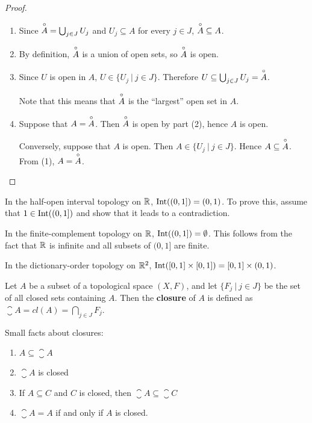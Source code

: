 \begin{proof}
	\begin{enumerate}
		\item Since $\overset{\circ}{A} = \bigcup_{j\in J} U_j$ and $U_j \subseteq A$ for every $j \in J$, $\overset{\circ}{A}\subseteq A$. 
		\item By definition, $\overset{\circ}{A}$ is a union of open sets, so $\overset{\circ}{A}$ is open. 
		\item Since $U$ is open in $A$, $U \in \{ U_j\ |\ j\in J\}$. Therefore $U\subseteq \bigcup_{j\in J} U_j = \overset{\circ}{A}$. 
		
		Note that this means that $\overset{\circ}{A}$ is the ``largest'' open set in $A$. 
		\item Suppose that $A = \overset{\circ}{A}$. Then $\overset{\circ}{A}$ is open by part (2), hence $A$ is open.
		
		Conversely, suppose that $A$ is open. Then $A\in \{U_j\ |\ j\in J\}$. Hence $A \subseteq \overset{\circ}{A}$. From (1), $A = \overset{\circ}{A}$. 
	\end{enumerate}
\end{proof}
\begin{example}
	In the half-open interval topology on $\mathbb R$, $\mathrm{Int}((0,1])=(0,1)$. To prove this, assume that $1\in \mathrm{Int}((0,1])$ and show that it leads to a contradiction. 
\end{example}
\begin{example}
	In the finite-complement topology on $\mathbb R$, $\mathrm{Int}((0,1])= \emptyset$. This follows from the fact that $\mathbb R$ is infinite and all subsets of $(0,1]$ are finite. 
\end{example}
\begin{example}
	In the dictionary-order topology on $\mathbb R^2$, $\mathrm{Int}( [ 0,1] \times [ 0,1] ) = [0,1] \times (0,1)$. \placeholder 
\end{example}
\begin{definition}
	Let $A$ be a subset of a topological space $(X,F)$, and let $\{ F_j\ |\ j \in J \}$ be the set of all closed sets containing $A$. Then the {\bf closure} of $A$ is defined as $\closure{A} = cl(A) = \bigcap_{j \in J}F_j$. 
\end{definition}
\begin{smallfact}
	Small facts about closures: 
	\begin{enumerate}
		\item $A \subseteq \closure{A}$ 
		\item $\closure{A}$ is closed 
		\item If $A \subseteq C$ and $C$ is closed, then $\closure{A}\subseteq\closure{C}$ 
		\item $\closure{A}=A$ if and only if $A$ is closed. 
	\end{enumerate}
\end{smallfact}
